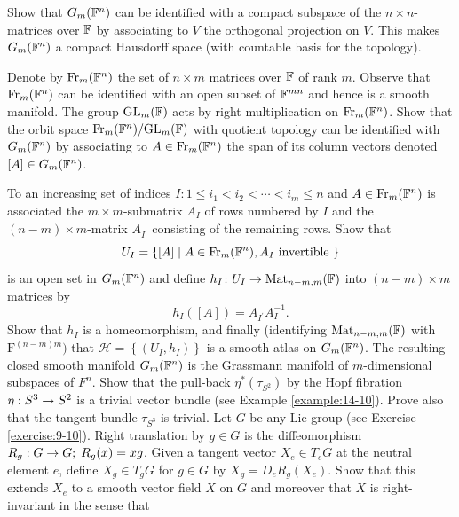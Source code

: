 \begin{enumerate}[\theexercise.1]
    Show that ${G}_{m}( {\mathbb{F}}^{n})$ can be identified with a compact subspace of the $n \times  n$-matrices over $\mathbb{F}$ by associating to $V$ the orthogonal projection on $V$. This makes ${G}_{m}( {\mathbb{F}}^{n})$ a compact Hausdorff space (with countable basis for the topology).\par
    Denote by ${\mathrm{Fr}}_{m}( {\mathbb{F}}^{n})$ the set of $n \times  m$ matrices over $\mathbb{F}$ of rank $m$. Observe that ${\mathrm{Fr}}_{m}( {\mathbb{F}}^{n})$ can be identified with an open subset of ${\mathbb{F}}^{mn}$ and hence is a smooth manifold. The group ${\mathrm{{GL}}}_{m}(\mathbb{F})$ acts by right multiplication on ${\mathrm{Fr}}_{m}( {\mathbb{F}}^{n})$. Show that the orbit space ${\mathrm{Fr}}_{m}( {\mathbb{F}}^{n}) /{\mathrm{{GL}}}_{m}( \mathbb{F})$ with quotient topology can be identified with ${G}_{m}( {\mathbb{F}}^{n})$ by associating to $A \in  {\ensuremath{\mathrm{Fr}}}_{m}( {\mathbb{F}}^{n})$ the span of its column vectors denoted $[ A]  \in  {G}_{m}( {\mathbb{F}}^{n})$. \par
    To an increasing set of indices $I\colon 1 \leq  {i}_{1} < {i}_{2} < \cdots  < {i}_{m} \leq  n$ and $A \in  {\ensuremath{\mathrm{Fr}}}_{m}( {\mathbb{F}}^{n})$ is associated the $m \times m$-submatrix ${A}_{I}$ of rows numbered by $I$ and the $( {n- m})  \times  m$-matrix ${A}_{{I}^{\prime }}$ consisting of the remaining rows. Show that
    \[
      {U}_{I} = \left\{  {[  A]   \mid  A \in  {\ensuremath{\mathrm{Fr}}}_{m}( {\mathbb{F}}^{n}),{A}_{I}\text{ invertible }}\right\}
    \]
    is an open set in ${G}_{m}( {\mathbb{F}}^{n})$ and define ${h}_{I}\colon {U}_{I} \rightarrow  {\ensuremath{\mathrm{Mat}}}_{n- m,m}( \mathbb{F})$ into $( {n- m})  \times  m$ matrices by
    \[
      {h}_{I}( [  A]  )  = {A}_{{I}^{\prime }}{A}_{I}^{-1}.
    \]
    Show that ${h}_{I}$ is a homeomorphism, and finally (identifying ${\mathrm{Mat}}_{n- m,m}( \mathbb{F})$ with ${\mathrm{F}}^{( {n- m}) m})$ that $\mathcal{H} = \left\{  ( {{U}_{I},{h}_{I}}) \right\}$ is a smooth atlas on ${G}_{m}( {\mathbb{F}}^{n})$. The resulting closed smooth manifold ${G}_{m}( {\mathbb{F}}^{n})$ is the Grassmann manifold of $m$-dimensional subspaces of ${F}^{n}$.
  \newchap[15]
  \NewItem Show that the pull-back ${\eta }^*( {\tau }_{{S}^{2}})$ by the Hopf fibration $\eta  : {S}^{3} \rightarrow  {S}^{2}$ is a trivial vector bundle (see Example \ref{example:14-10}). Prove also that the tangent bundle ${\tau }_{{S}^{3}}$ is trivial.
  \NewItem Let $G$ be any Lie group (see Exercise \ref{exercise:9-10}). Right translation by $g \in  G$ is the diffeomorphism ${R}_{g} : G \rightarrow  G;\;{R}_{g}( x)  = {xg}$. Given a tangent vector ${X}_{e} \in  {T}_{e}G$ at the neutral element $e$, define ${X}_{g} \in  {T}_{g}G$ for $g \in  G$ by ${X}_{g} = {D}_{e}{R}_{g}( {X}_{e})$. Show that this extends ${X}_{e}$ to a smooth vector field $X$ on $G$ and moreover that $X$ is right-invariant in the sense that

\end{enumerate}
